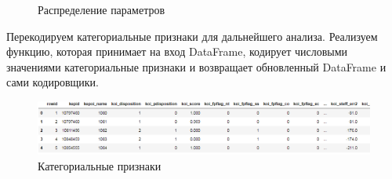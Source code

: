 \documentclass[a4paper,14pt]{article}
\begin{document}
\begin{figure}[h]
\begin{minipage}[h]{0.5\linewidth}
\end{minipage}
\hfill
\begin{minipage}[h]{0.5\linewidth}
\end{minipage}
\caption{Распределение параметров}
\end{figure}

Перекодируем категориальные признаки для дальнейшего анализа. Реализуем функцию, которая принимает на вход DataFrame, кодирует числовыми значениями категориальные признаки и возвращает обновленный DataFrame и сами кодировщики.

\begin{figure}[h!]
\centering
\includegraphics[scale=0.6]{pics/4.png}
\caption{Категориальные признаки}
\end{figure}
\end{document}
